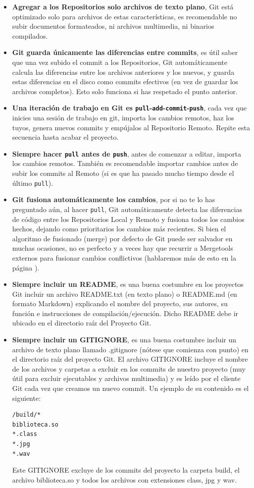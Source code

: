 \documentclass{article}
\begin{document}
\begin{itemize}
\item \textbf{Agregar a los Repositorios solo archivos de texto plano}, Git está optimizado solo para archivos de estas características, es recomendable no subir documentos formateados, ni archivos multimedia, ni binarios compilados.
\item \textbf{Git guarda únicamente las diferencias entre commits}, es útil saber que una vez subido el commit a los Repositorios, Git automáticamente calcula las diferencias entre los archivos anteriores y los nuevos, y guarda estas diferencias en el disco como commits efectivos (en vez de guardar los archivos completos). Esto solo funciona si has respetado el punto anterior.
\item \textbf{Una iteración de trabajo en Git es \texttt{pull}-\texttt{add}-\texttt{commit}-\texttt{push}}, cada vez que inicies una sesión de trabajo en git, importa los cambios remotos, haz los tuyos, genera nuevos commits y empújalos al Repositorio Remoto. Repite esta secuencia hasta acabar el proyecto.
\item \textbf{Siempre hacer \texttt{pull} antes de \texttt{push}}, antes de comenzar a editar, importa los cambios remotos. También es recomendable importar cambios antes de subir los commits al Remoto (si es que ha pasado mucho tiempo desde el último \texttt{pull}).
\item \textbf{Git fusiona automáticamente los cambios}, por si no te lo has preguntado aún, al hacer \texttt{pull}, Git automáticamente detecta las diferencias de código entre los Repositorios Local y Remoto y fusiona todos los cambios hechos, dejando como prioritarios los cambios más recientes. Si bien el algoritmo de fusionado (merge) por defecto de Git puede ser salvador en muchas ocasiones, no es perfecto y a veces hay que recurrir a Mergetools externos para fusionar cambios conflictivos (hablaremos más de esto en la página \pageref{merge}).
\item \textbf{Siempre incluir un README}, es una buena costumbre en los proyectos Git incluir un archivo \textsf{README.txt} (en texto plano) o \textsf{README.md} (en formato Markdown) explicando el nombre del proyecto, sus autores, su función e instrucciones de compilación/ejecución. Dicho README debe ir ubicado en el directorio raíz del Proyecto Git.
\item \textbf{Siempre incluir un GITIGNORE}, es una buena costumbre incluir un archivo de texto plano llamado \textsf{.gitignore} (nótese que comienza con punto) en el directorio raíz del proyecto Git. El archivo GITIGNORE incluye el nombre de los archivos y carpetas a excluir en los commits de nuestro proyecto (muy útil para excluir ejecutables y archivos multimedia) y es leído por el cliente Git cada vez que creamos un nuevo commit. Un ejemplo de su contenido es el siguiente:
\begin{verbatim}
/build/*
biblioteca.so
*.class
*.jpg
*.wav
\end{verbatim}
Este GITIGNORE excluye de los commits del proyecto la carpeta \textsf{build}, el archivo \textsf{biblioteca.so} y todos los archivos con extensiones \textsf{class}, \textsf{jpg} y \textsf{wav}.
\end{itemize}
\end{document}
